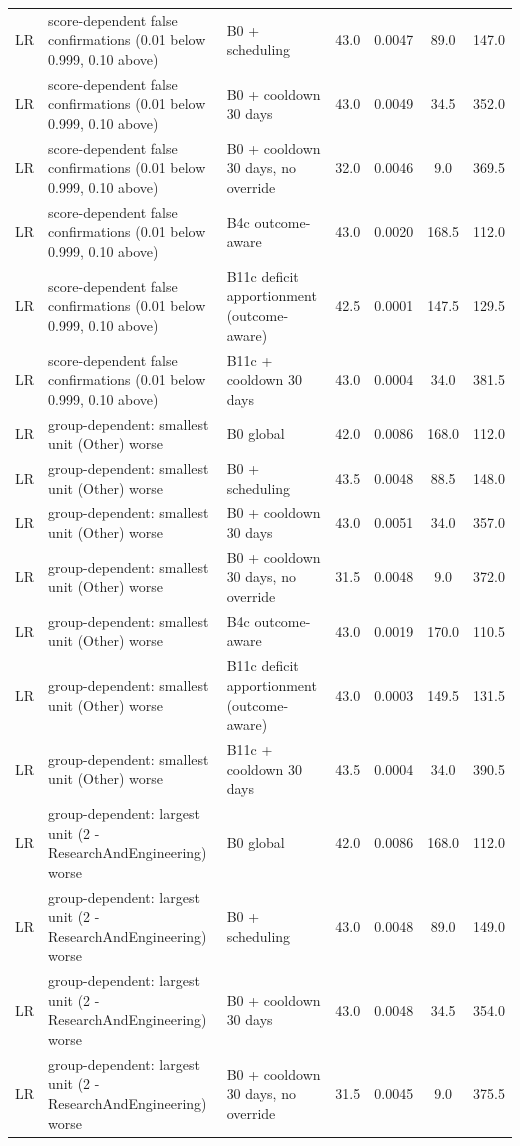 \documentclass[10pt,onecolumn,letterpaper]{article}
\begin{document}
\begin{longtable}{lp{5.2cm}p{4.4cm}cccc}
LR & score-dependent false confirmations (0.01 below 0.999, 0.10 above) & B0 + scheduling & 43.0 & 0.0047 & 89.0 & 147.0 \\
LR & score-dependent false confirmations (0.01 below 0.999, 0.10 above) & B0 + cooldown 30 days & 43.0 & 0.0049 & 34.5 & 352.0 \\
LR & score-dependent false confirmations (0.01 below 0.999, 0.10 above) & B0 + cooldown 30 days, no override & 32.0 & 0.0046 & 9.0 & 369.5 \\
LR & score-dependent false confirmations (0.01 below 0.999, 0.10 above) & B4c outcome-aware & 43.0 & 0.0020 & 168.5 & 112.0 \\
LR & score-dependent false confirmations (0.01 below 0.999, 0.10 above) & B11c deficit apportionment (outcome-aware) & 42.5 & 0.0001 & 147.5 & 129.5 \\
LR & score-dependent false confirmations (0.01 below 0.999, 0.10 above) & B11c + cooldown 30 days & 43.0 & 0.0004 & 34.0 & 381.5 \\
LR & group-dependent: smallest unit (Other) worse & B0 global & 42.0 & 0.0086 & 168.0 & 112.0 \\
LR & group-dependent: smallest unit (Other) worse & B0 + scheduling & 43.5 & 0.0048 & 88.5 & 148.0 \\
LR & group-dependent: smallest unit (Other) worse & B0 + cooldown 30 days & 43.0 & 0.0051 & 34.0 & 357.0 \\
LR & group-dependent: smallest unit (Other) worse & B0 + cooldown 30 days, no override & 31.5 & 0.0048 & 9.0 & 372.0 \\
LR & group-dependent: smallest unit (Other) worse & B4c outcome-aware & 43.0 & 0.0019 & 170.0 & 110.5 \\
LR & group-dependent: smallest unit (Other) worse & B11c deficit apportionment (outcome-aware) & 43.0 & 0.0003 & 149.5 & 131.5 \\
LR & group-dependent: smallest unit (Other) worse & B11c + cooldown 30 days & 43.5 & 0.0004 & 34.0 & 390.5 \\
LR & group-dependent: largest unit (2 - ResearchAndEngineering) worse & B0 global & 42.0 & 0.0086 & 168.0 & 112.0 \\
LR & group-dependent: largest unit (2 - ResearchAndEngineering) worse & B0 + scheduling & 43.0 & 0.0048 & 89.0 & 149.0 \\
LR & group-dependent: largest unit (2 - ResearchAndEngineering) worse & B0 + cooldown 30 days & 43.0 & 0.0048 & 34.5 & 354.0 \\
LR & group-dependent: largest unit (2 - ResearchAndEngineering) worse & B0 + cooldown 30 days, no override & 31.5 & 0.0045 & 9.0 & 375.5 \\

\end{longtable}
\end{document}
